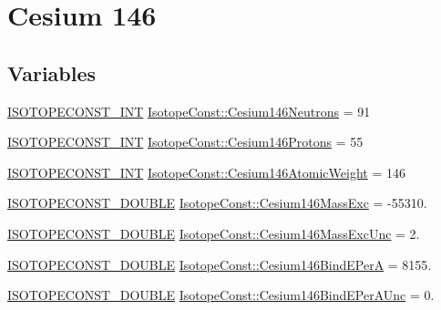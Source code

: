 \hypertarget{group___isotope_const-_cesium-_cs146}{}\section{Cesium 146}
\label{group___isotope_const-_cesium-_cs146}
\subsection*{Variables}
\begin{DoxyCompactItemize}
\item 
\mbox{\hyperlink{group___isotope_const-_macros_ga5f18360b3e99483a35c32d789e62621c}{I\+S\+O\+T\+O\+P\+E\+C\+O\+N\+S\+T\+\_\+\+I\+NT}} \mbox{\hyperlink{group___isotope_const-_cesium-_cs146_gabd1a82d0d8426f7098666df45babdc9f}{Isotope\+Const\+::\+Cesium146\+Neutrons}} = 91
\item 
\mbox{\hyperlink{group___isotope_const-_macros_ga5f18360b3e99483a35c32d789e62621c}{I\+S\+O\+T\+O\+P\+E\+C\+O\+N\+S\+T\+\_\+\+I\+NT}} \mbox{\hyperlink{group___isotope_const-_cesium-_cs146_ga27c7dfe94cc61951750cc6db3a7dd293}{Isotope\+Const\+::\+Cesium146\+Protons}} = 55
\item 
\mbox{\hyperlink{group___isotope_const-_macros_ga5f18360b3e99483a35c32d789e62621c}{I\+S\+O\+T\+O\+P\+E\+C\+O\+N\+S\+T\+\_\+\+I\+NT}} \mbox{\hyperlink{group___isotope_const-_cesium-_cs146_gaaa4394b8860efa0d96937ae6e5709a85}{Isotope\+Const\+::\+Cesium146\+Atomic\+Weight}} = 146
\item 
\mbox{\hyperlink{group___isotope_const-_macros_ga8f45a7272ce02c0b4c65c44636ed719a}{I\+S\+O\+T\+O\+P\+E\+C\+O\+N\+S\+T\+\_\+\+D\+O\+U\+B\+LE}} \mbox{\hyperlink{group___isotope_const-_cesium-_cs146_gacccf32f0f5db9efd411bee863ccb4b8d}{Isotope\+Const\+::\+Cesium146\+Mass\+Exc}} = -\/55310.
\item 
\mbox{\hyperlink{group___isotope_const-_macros_ga8f45a7272ce02c0b4c65c44636ed719a}{I\+S\+O\+T\+O\+P\+E\+C\+O\+N\+S\+T\+\_\+\+D\+O\+U\+B\+LE}} \mbox{\hyperlink{group___isotope_const-_cesium-_cs146_ga7199f5903f31caf390eb71ce079d0f97}{Isotope\+Const\+::\+Cesium146\+Mass\+Exc\+Unc}} = 2.
\item 
\mbox{\hyperlink{group___isotope_const-_macros_ga8f45a7272ce02c0b4c65c44636ed719a}{I\+S\+O\+T\+O\+P\+E\+C\+O\+N\+S\+T\+\_\+\+D\+O\+U\+B\+LE}} \mbox{\hyperlink{group___isotope_const-_cesium-_cs146_ga0364022337c3ff269569fb2c0b19e3fe}{Isotope\+Const\+::\+Cesium146\+Bind\+E\+PerA}} = 8155.
\item 
\mbox{\hyperlink{group___isotope_const-_macros_ga8f45a7272ce02c0b4c65c44636ed719a}{I\+S\+O\+T\+O\+P\+E\+C\+O\+N\+S\+T\+\_\+\+D\+O\+U\+B\+LE}} \mbox{\hyperlink{group___isotope_const-_cesium-_cs146_ga13cc1b1ef6b9842fab7b1bc084b952a2}{Isotope\+Const\+::\+Cesium146\+Bind\+E\+Per\+A\+Unc}} = 0.

\end{DoxyCompactItemize}
